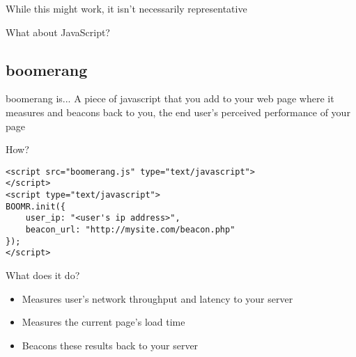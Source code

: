 \documentclass{beamer}
\begin{document}
\begin{frame}{}
  \begin{center}
  While this might work, it isn't necessarily representative
  \end{center}
\end{frame}

\begin{frame}{}
  \begin{center}
  What about JavaScript?
  \end{center}
\end{frame}

\subsection{boomerang}


\begin{frame}{}
\end{frame}

\begin{frame}
  \begin{block}{boomerang is...}
A piece of javascript that you add to your web page where it measures and beacons back to you, the end user's perceived performance of your page
  \end{block}
\end{frame}

\begin{frame}[fragile]{How?}
  \begin{verbatim}
<script src="boomerang.js" type="text/javascript">
</script>
<script type="text/javascript">
BOOMR.init({
    user_ip: "<user's ip address>",
    beacon_url: "http://mysite.com/beacon.php"
});
</script>
  \end{verbatim}
\end{frame}

\begin{frame}{What does it do?}
  \begin{itemize}
  \item Measures user's network throughput and latency to your server
  \item Measures the current page's load time
  \item Beacons these results back to your server
  \end{itemize}
\end{frame}
\end{document}
